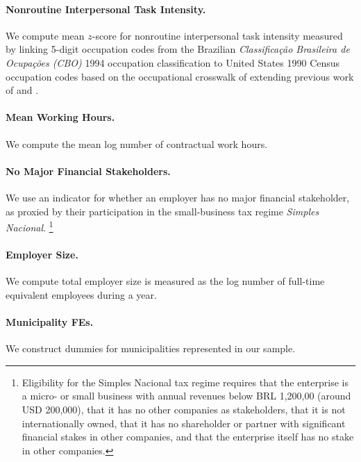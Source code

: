 \paragraph{Nonroutine Interpersonal Task Intensity.}

We compute mean $z$-score for nonroutine interpersonal task intensity measured by linking 5-digit occupation codes from the Brazilian \emph{Classifica{\c{c}}{\~{a}}o Brasileira de Ocupa{\c{c}}{\~{o}}es (CBO)} 1994 occupation classification to United States 1990 Census occupation codes based on the occupational crosswalk of \citet{deSouza2024} extending previous work of \citet{AutorDorn2009} and \citet{AcemogluAutor2011}.


\paragraph{Mean Working Hours.}

We compute the mean log number of contractual work hours.


\paragraph{No Major Financial Stakeholders.}

We use an indicator for whether an employer has no major financial stakeholder, as proxied by their participation in the small-business tax regime \emph{Simples Nacional}.%
%
\footnote{Eligibility for the Simples Nacional tax regime requires that the enterprise is a micro- or small business with annual revenues below BRL 1,200,00 (around USD 200,000), that it has no other companies as stakeholders, that it is not internationally owned, that it has no shareholder or partner with significant financial stakes in other companies, and that the enterprise itself has no stake in other companies.} %
%


\paragraph{Employer Size.}

We compute total employer size is measured as the log number of full-time equivalent employees during a year.


\paragraph{Municipality FEs.}

We construct dummies for {\NMunicipalities} municipalities represented in our sample.


